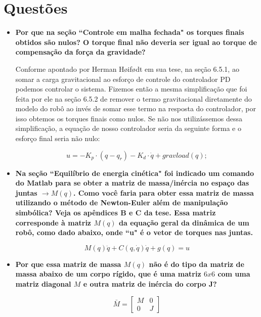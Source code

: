 \documentclass{article}
\begin{document}
\section{Questões}
\begin{itemize}
	\item \textbf{Por que na seção ``Controle em malha fechada" os torques finais obtidos são nulos? O torque final não deveria ser igual ao torque de compensação da força da gravidade?}
	
	Conforme apontado por Herman Høifødt\cite{bb:tese} em sua tese, na seção 6.5.1, ao somar a carga gravitacional ao esforço de controle do controlador PD podemos controlar o sistema. Fizemos então a mesma simplificação que foi feita por ele na seção 6.5.2 de remover o termo gravitacional diretamente do modelo do robô ao invés de somar esse termo na resposta do controlador, por isso obtemos os torques finais como nulos.
	Se não nos utilizássemos dessa simplificação, a equação de nosso controlador seria da seguinte forma e o esforço final seria não nulo:
	
	\begin{equation}
		u = -K_p\cdot (q - q_r) -K_d\cdot\dot{q} + gravload(q);
	\end{equation}
	
	\item \textbf{Na seção ``Equilíbrio de energia cinética" foi indicado um comando do Matlab para se obter a matriz de massa/inércia no espaço das juntas $\rightarrow M(q)$. Como você faria para obter essa matriz de massa utilizando o método de Newton-Euler além de manipulação simbólica? Veja os apêndices B e C da tese\cite{bb:tese}. Essa matriz corresponde à matriz $M(q)$ da equação geral da dinâmica de um robô, como dado abaixo, onde ``u" é o vetor de torques nas juntas.}
	
	\begin{equation}
	\label{eq:mq}
	M(q)\ddot{q}+C(q,\dot{q})\dot{q}+g(q)=u
	\end{equation}
	
	
	\item \textbf{Por que essa matriz de massa $M(q)$ não é do tipo da matriz de massa abaixo de um corpo rígido, que é uma matriz $6x6$ com uma matriz diagonal $M$ e outra matriz de inércia do corpo J?}
	
	\begin{equation}
	\label{eq:m6x6}
	\bar{M}=\begin{bmatrix}
	M & 0\\
	0 & J
	\end{bmatrix}
	\end{equation}
	
	
\end{itemize}
\end{document}
